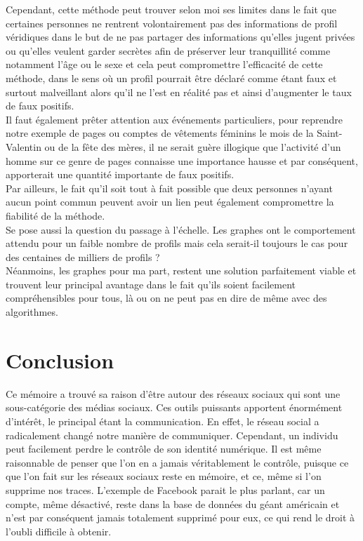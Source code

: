 \documentclass[12pt]{report}
\begin{document}
Cependant, cette méthode peut trouver selon moi ses limites dans le fait que certaines personnes ne rentrent volontairement pas des informations de profil véridiques dans le but de ne pas partager des informations qu'elles jugent privées ou qu'elles veulent garder secrètes afin de préserver leur tranquillité comme notamment l'âge ou le sexe et cela peut compromettre l'efficacité de cette méthode, dans le sens où un profil pourrait être déclaré comme étant faux et surtout malveillant alors qu'il ne l'est en réalité pas et ainsi d'augmenter le taux de faux positifs.\\ 
Il faut également prêter attention aux événements particuliers, pour reprendre notre exemple de pages ou comptes de vêtements féminins le mois de la Saint-Valentin ou de la fête des mères, il ne serait guère illogique que l'activité d'un homme sur ce genre de pages connaisse une importance hausse et par conséquent, apporterait une quantité importante de faux positifs.\\
Par ailleurs, le fait qu'il soit tout à fait possible que deux personnes n'ayant aucun point commun peuvent avoir un lien peut également compromettre la fiabilité de la méthode. \\
Se pose aussi la question du passage à l'échelle. Les graphes ont le comportement attendu pour un faible nombre de profils mais cela serait-il toujours le cas pour des centaines de milliers de profils ? \\

Néanmoins, les graphes pour ma part, restent une solution parfaitement viable et trouvent leur principal avantage dans le fait qu'ils soient facilement compréhensibles pour tous, là ou on ne peut pas en dire de même avec des algorithmes.

\chapter{Conclusion}
Ce mémoire a trouvé sa raison d'être autour des réseaux sociaux qui sont une sous-catégorie des médias sociaux. Ces outils puissants apportent énormément d'intérêt, le principal étant la communication. En effet, le réseau social a radicalement changé notre manière de communiquer. Cependant, un individu peut facilement perdre le contrôle de son identité numérique. Il est même raisonnable de penser que l'on en a jamais véritablement le contrôle, puisque ce que l'on fait sur les réseaux sociaux reste en mémoire, et ce, même si l'on supprime nos traces. L'exemple de Facebook parait le plus parlant, car un compte, même désactivé, reste dans la base de données du géant américain et n'est par conséquent jamais totalement supprimé pour eux, ce qui rend le droit à l'oubli difficile à obtenir. \\
\end{document}
